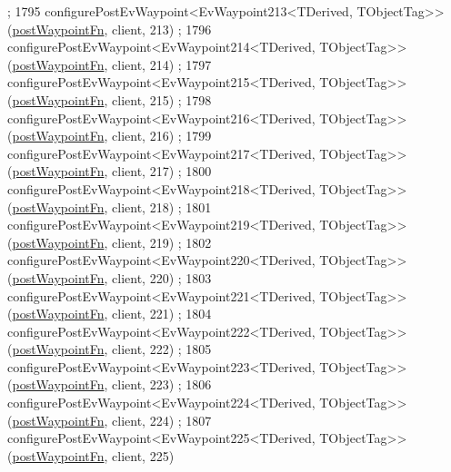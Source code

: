 \begin{DoxyCode}
      ;
1795     configurePostEvWaypoint<EvWaypoint213<TDerived, TObjectTag>>(\hyperlink{classcl__move__base__z_1_1WaypointEventDispatcher_a964a57fcce5d48ec60243230722d8dd7}{postWaypointFn}, client, 213)
      ;
1796     configurePostEvWaypoint<EvWaypoint214<TDerived, TObjectTag>>(\hyperlink{classcl__move__base__z_1_1WaypointEventDispatcher_a964a57fcce5d48ec60243230722d8dd7}{postWaypointFn}, client, 214)
      ;
1797     configurePostEvWaypoint<EvWaypoint215<TDerived, TObjectTag>>(\hyperlink{classcl__move__base__z_1_1WaypointEventDispatcher_a964a57fcce5d48ec60243230722d8dd7}{postWaypointFn}, client, 215)
      ;
1798     configurePostEvWaypoint<EvWaypoint216<TDerived, TObjectTag>>(\hyperlink{classcl__move__base__z_1_1WaypointEventDispatcher_a964a57fcce5d48ec60243230722d8dd7}{postWaypointFn}, client, 216)
      ;
1799     configurePostEvWaypoint<EvWaypoint217<TDerived, TObjectTag>>(\hyperlink{classcl__move__base__z_1_1WaypointEventDispatcher_a964a57fcce5d48ec60243230722d8dd7}{postWaypointFn}, client, 217)
      ;
1800     configurePostEvWaypoint<EvWaypoint218<TDerived, TObjectTag>>(\hyperlink{classcl__move__base__z_1_1WaypointEventDispatcher_a964a57fcce5d48ec60243230722d8dd7}{postWaypointFn}, client, 218)
      ;
1801     configurePostEvWaypoint<EvWaypoint219<TDerived, TObjectTag>>(\hyperlink{classcl__move__base__z_1_1WaypointEventDispatcher_a964a57fcce5d48ec60243230722d8dd7}{postWaypointFn}, client, 219)
      ;
1802     configurePostEvWaypoint<EvWaypoint220<TDerived, TObjectTag>>(\hyperlink{classcl__move__base__z_1_1WaypointEventDispatcher_a964a57fcce5d48ec60243230722d8dd7}{postWaypointFn}, client, 220)
      ;
1803     configurePostEvWaypoint<EvWaypoint221<TDerived, TObjectTag>>(\hyperlink{classcl__move__base__z_1_1WaypointEventDispatcher_a964a57fcce5d48ec60243230722d8dd7}{postWaypointFn}, client, 221)
      ;
1804     configurePostEvWaypoint<EvWaypoint222<TDerived, TObjectTag>>(\hyperlink{classcl__move__base__z_1_1WaypointEventDispatcher_a964a57fcce5d48ec60243230722d8dd7}{postWaypointFn}, client, 222)
      ;
1805     configurePostEvWaypoint<EvWaypoint223<TDerived, TObjectTag>>(\hyperlink{classcl__move__base__z_1_1WaypointEventDispatcher_a964a57fcce5d48ec60243230722d8dd7}{postWaypointFn}, client, 223)
      ;
1806     configurePostEvWaypoint<EvWaypoint224<TDerived, TObjectTag>>(\hyperlink{classcl__move__base__z_1_1WaypointEventDispatcher_a964a57fcce5d48ec60243230722d8dd7}{postWaypointFn}, client, 224)
      ;
1807     configurePostEvWaypoint<EvWaypoint225<TDerived, TObjectTag>>(\hyperlink{classcl__move__base__z_1_1WaypointEventDispatcher_a964a57fcce5d48ec60243230722d8dd7}{postWaypointFn}, client, 225)

\end{DoxyCode}
